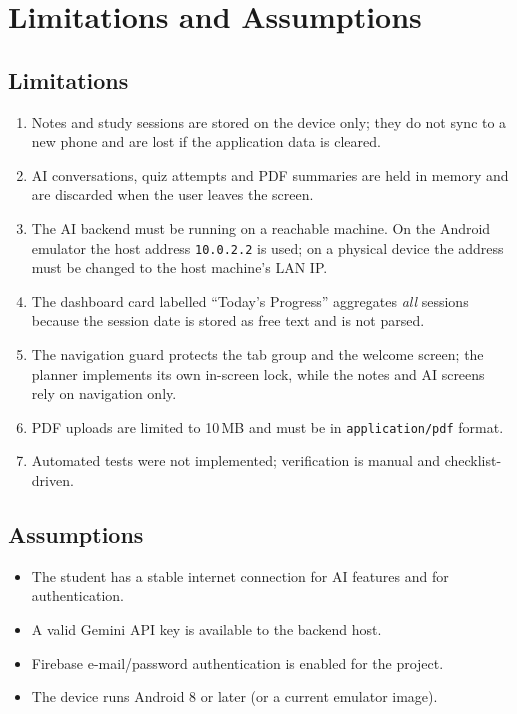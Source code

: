 \documentclass[12pt,a4paper,oneside]{report}
\begin{document}
\section{Limitations and Assumptions}

\subsection{Limitations}
\begin{enumerate}[label=\textbf{L-\arabic*.}, leftmargin=*, itemsep=2pt]
  \item Notes and study sessions are stored on the device only; they do not sync to
        a new phone and are lost if the application data is cleared.
  \item AI conversations, quiz attempts and PDF summaries are held in memory and are
        discarded when the user leaves the screen.
  \item The AI backend must be running on a reachable machine. On the Android
        emulator the host address \texttt{10.0.2.2} is used; on a physical device the
        address must be changed to the host machine's LAN IP.
  \item The dashboard card labelled ``Today's Progress'' aggregates \emph{all}
        sessions because the session date is stored as free text and is not parsed.
  \item The navigation guard protects the tab group and the welcome screen; the
        planner implements its own in-screen lock, while the notes and AI screens
        rely on navigation only.
  \item PDF uploads are limited to 10\,MB and must be in \texttt{application/pdf}
        format.
  \item Automated tests were not implemented; verification is manual and
        checklist-driven.
\end{enumerate}

\subsection{Assumptions}
\begin{itemize}[leftmargin=*, itemsep=1pt]
  \item The student has a stable internet connection for AI features and for
        authentication.
  \item A valid Gemini API key is available to the backend host.
  \item Firebase e-mail/password authentication is enabled for the project.
  \item The device runs Android 8 or later (or a current emulator image).
\end{itemize}
\end{document}
